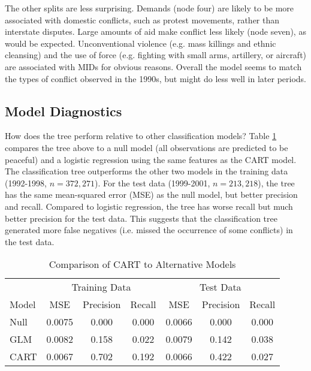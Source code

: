 \documentclass[12pt,letterpaper]{article} %
\begin{document}
The other splits are less surprising. Demands (node four) are likely to be more associated with domestic conflicts, such as protest movements, rather than interstate disputes. Large amounts of aid make conflict less likely (node seven), as would be expected. Unconventional violence (e.g. mass killings and ethnic cleansing) and the use of force (e.g. fighting with small arms, artillery, or aircraft) are associated with MIDs for obvious reasons. Overall the model seems to match the types of conflict observed in the 1990s, but might do less well in later periods. 

\subsection{Model Diagnostics}

How does the tree perform relative to other classification models? Table \ref{cart-perf} compares the tree above to a null model (all observations are predicted to be peaceful) and a logistic regression using the same features as the CART model. The classification tree outperforms the other two models in the training data (1992-1998, $n=372,271$). For the test data (1999-2001, $n=213,218$), the tree has the same mean-squared error (MSE) as the null model, but better precision and recall. Compared to logistic regression, the tree has worse recall but much better precision for the test data. This suggests that the classification tree generated more false negatives (i.e. missed the occurrence of some conflicts) in the test data.

\begin{table}
	\caption{Comparison of CART to Alternative Models}
	\label{cart-perf}
  \begin{center}
  \begin{tabular}{l|ccc|ccc}
   \multicolumn{1}{c}{} & \multicolumn{3}{c}{Training Data} & \multicolumn{3}{c}{Test Data} \\
  Model & MSE & Precision & Recall & MSE & Precision & Recall \\
  \midrule
  Null & 0.0075 & 0.000 & 0.000 & 0.0066 & 0.000 & 0.000 \\
  GLM & 0.0082 & 0.158 & 0.022  & 0.0079 & 0.142 & 0.038 \\
  CART & 0.0067 & 0.702 & 0.192 & 0.0066 & 0.422 & 0.027 
  \end{tabular}
  \end{center}
\end{table}


\end{document}
